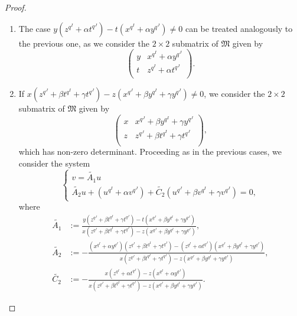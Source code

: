 \begin{proof}
\begin{enumerate}
\item[(ii)] The case $y \left(z^{q^I}+\alpha t^{q^J}\right) - t\left(x^{q^I}+\alpha y^{q^J}\right)\neq 0$ can be treated analogously to the previous one, as we consider the $2\times 2$ submatrix of $\mathfrak{M}$ given by 
\begin{equation*}
    \begin{pmatrix}
    y &  x^{q^I}+\alpha y^{q^J} \\
    t &  z^{q^I}+\alpha t^{q^J}\\
    \end{pmatrix}.
\end{equation*}
\item[(iii)] If $x \left(z^{q^J}+\beta t^{q^I} + \gamma t^{q^J}\right) - z\left(x^{q^J}+\beta y^{q^I} + \gamma y^{q^J}\right)\neq 0$, we consider the $2\times 2$ submatrix of $\mathfrak{M}$ given by 
\begin{equation*}
    \begin{pmatrix}
    x &  x^{q^J}+\beta y^{q^I} + \gamma y^{q^J} \\
    z &  z^{q^J}+\beta t^{q^I} + \gamma t^{q^J} \\
    \end{pmatrix},
\end{equation*}
which has non-zero determinant. Proceeding as in the previous cases, we consider the system
\begin{equation*}
    \begin{cases}
     v = \tilde{A_1} u \\
    \tilde{A_2} u + \left(u^{q^I} + \alpha v^{q^J}\right) + \tilde{C_2}\left(u^{q^J} + \beta v^{q^I} + \gamma v^{q^J}\right) = 0,
    \end{cases}
\end{equation*}
where
\begin{equation*}
\begin{split}
    \tilde{A_1} &:= \frac{y \left(z^{q^J}+\beta t^{q^I} + \gamma t^{q^J}\right) - t\left(x^{q^J}+\beta y^{q^I} + \gamma y^{q^J}\right)}{x \left(z^{q^J}+\beta t^{q^I} + \gamma t^{q^J}\right) - z\left(x^{q^J}+\beta y^{q^I} + \gamma y^{q^J}\right)},\\
    \tilde{A_2} &:= -\frac{\left(x^{q^I}+\alpha y^{q^J}\right)\left(z^{q^J}+\beta t^{q^I} + \gamma t^{q^J}\right) - \left(z^{q^I}+\alpha t^{q^J}\right)\left(x^{q^J}+\beta y^{q^I} + \gamma y^{q^J}\right)}{x \left(z^{q^J}+\beta t^{q^I} + \gamma t^{q^J}\right) - z\left(x^{q^J}+\beta y^{q^I} + \gamma y^{q^J}\right)},\\
    \tilde{C_2} &:= -\frac{x \left(z^{q^I}+\alpha t^{q^J}\right) - z\left(x^{q^I}+\alpha y^{q^J}\right)}{x \left(z^{q^J}+\beta t^{q^I} + \gamma t^{q^J}\right) - z\left(x^{q^J}+\beta y^{q^I} + \gamma y^{q^J}\right)}.

\end{split}
\end{equation*}
\end{enumerate}
\end{proof}
